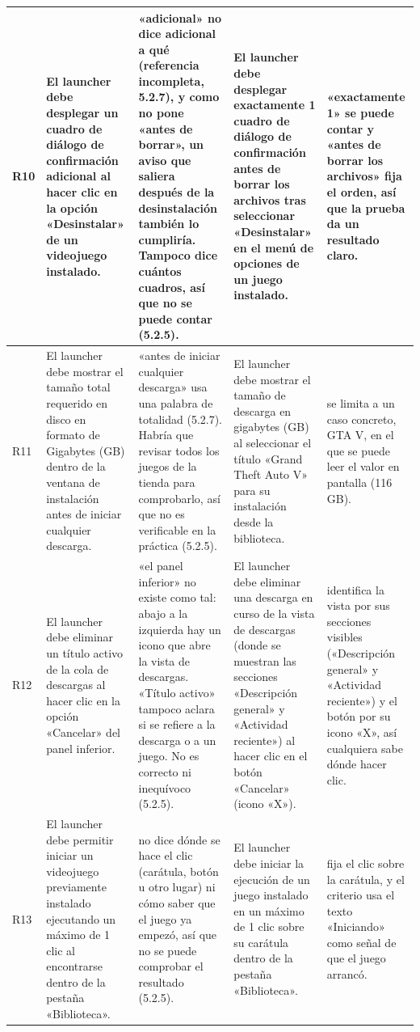 \documentclass[10pt,a4paper]{article}
\begin{document}
\begin{landscape}
\begin{longtable}{|>{\raggedright\arraybackslash}p{1cm}|>{\raggedright\arraybackslash}p{5.6cm}|>{\raggedright\arraybackslash}p{5.6cm}|>{\raggedright\arraybackslash}p{7.4cm}|>{\raggedright\arraybackslash}p{5.0cm}|}
R10 & El launcher debe desplegar un cuadro de diálogo de confirmación adicional al hacer clic en la opción «Desinstalar» de un videojuego instalado. & «adicional» no dice adicional a qué (referencia incompleta, 5.2.7), y como no pone «antes de borrar», un aviso que saliera después de la desinstalación también lo cumpliría. Tampoco dice cuántos cuadros, así que no se puede contar (5.2.5). & El launcher debe desplegar exactamente 1 cuadro de diálogo de confirmación antes de borrar los archivos tras seleccionar «Desinstalar» en el menú de opciones de un juego instalado. & «exactamente 1» se puede contar y «antes de borrar los archivos» fija el orden, así que la prueba da un resultado claro. \\ \hline
R11 & El launcher debe mostrar el tamaño total requerido en disco en formato de Gigabytes (GB) dentro de la ventana de instalación antes de iniciar cualquier descarga. & «antes de iniciar cualquier descarga» usa una palabra de totalidad (5.2.7). Habría que revisar todos los juegos de la tienda para comprobarlo, así que no es verificable en la práctica (5.2.5). & El launcher debe mostrar el tamaño de descarga en gigabytes (GB) al seleccionar el título «Grand Theft Auto V» para su instalación desde la biblioteca. & se limita a un caso concreto, GTA V, en el que se puede leer el valor en pantalla (116 GB). \\ \hline
R12 & El launcher debe eliminar un título activo de la cola de descargas al hacer clic en la opción «Cancelar» del panel inferior. & «el panel inferior» no existe como tal: abajo a la izquierda hay un icono que abre la vista de descargas. «Título activo» tampoco aclara si se refiere a la descarga o a un juego. No es correcto ni inequívoco (5.2.5). & El launcher debe eliminar una descarga en curso de la vista de descargas (donde se muestran las secciones «Descripción general» y «Actividad reciente») al hacer clic en el botón «Cancelar» (icono «X»). & identifica la vista por sus secciones visibles («Descripción general» y «Actividad reciente») y el botón por su icono «X», así cualquiera sabe dónde hacer clic. \\ \hline
R13 & El launcher debe permitir iniciar un videojuego previamente instalado ejecutando un máximo de 1 clic al encontrarse dentro de la pestaña «Biblioteca». & no dice dónde se hace el clic (carátula, botón u otro lugar) ni cómo saber que el juego ya empezó, así que no se puede comprobar el resultado (5.2.5). & El launcher debe iniciar la ejecución de un juego instalado en un máximo de 1 clic sobre su carátula dentro de la pestaña «Biblioteca». & fija el clic sobre la carátula, y el criterio usa el texto «Iniciando» como señal de que el juego arrancó. \\ \hline

\end{longtable}
\end{landscape}
\end{document}
